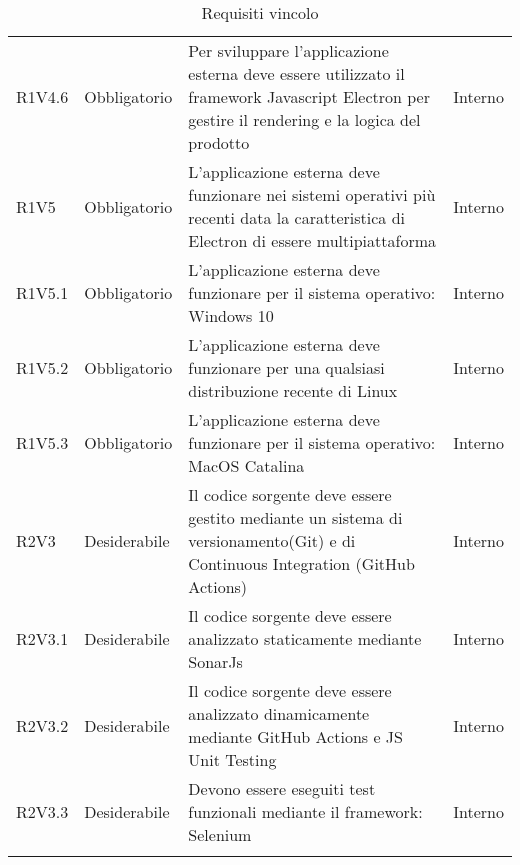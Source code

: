 \begin{longtable} {
		>{\centering}p{18mm} 
		>{\centering}p{28mm}
		>{}p{50mm} 
		>{}p{28mm}
		}
	R1V4.6 & 
	Obbligatorio & 
	Per sviluppare l'applicazione esterna deve essere utilizzato il framework Javascript Electron per gestire il rendering e la logica del prodotto &
	Interno  \TBstrut \\ [2mm]
	
	R1V5 & 
	Obbligatorio & 
	L'applicazione esterna deve funzionare nei sistemi operativi più recenti data la caratteristica di Electron di essere multipiattaforma & 
	Interno  \TBstrut \\ [2mm]

	R1V5.1 & 
	Obbligatorio & 
	L'applicazione esterna deve funzionare per il sistema operativo: Windows 10 &
	Interno  \TBstrut \\ [2mm]

	R1V5.2 & 
	Obbligatorio & 
	L'applicazione esterna deve funzionare per una qualsiasi distribuzione recente di Linux &
	Interno  \TBstrut \\ [2mm]

	R1V5.3 & 
	Obbligatorio & 
	L'applicazione esterna deve funzionare per il sistema operativo: MacOS Catalina &
	Interno  \TBstrut \\ [2mm]

		
	R2V3 &
	Desiderabile &
	Il codice sorgente deve essere gestito mediante un sistema di versionamento\glosp (Git) e di Continuous Integration (GitHub Actions) &
	Interno  \TBstrut \\ [2mm]		
	
	R2V3.1 &
	Desiderabile &
	Il codice sorgente deve essere analizzato staticamente mediante SonarJs\glo &
	Interno  \TBstrut \\ [2mm]
	
	R2V3.2 &
	Desiderabile &
	Il codice sorgente deve essere analizzato dinamicamente mediante GitHub Actions e JS Unit Testing &
	Interno  \TBstrut \\ [2mm]
	
	R2V3.3 &
	Desiderabile &
	Devono essere eseguiti test funzionali mediante il framework: Selenium &
	Interno  \TBstrut \\ [2mm]
	
	\rowcolor{white}
	\caption{Requisiti vincolo}
\end{longtable}
